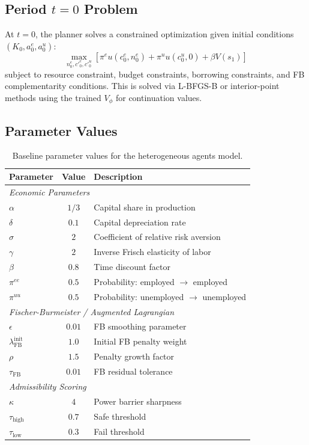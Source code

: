 \subsection{Period $t=0$ Problem}

At $t=0$, the planner solves a constrained optimization given initial conditions $(K_0, a_0^e, a_0^u)$:
\begin{equation}
    \max_{n_0^e, c'^e_0, c'^u_0} \left[ \pi^e u(c_0^e, n_0^e) + \pi^u u(c_0^u, 0) + \beta V(s_1) \right]
\end{equation}
subject to resource constraint, budget constraints, borrowing constraints, and FB complementarity conditions. This is solved via L-BFGS-B or interior-point methods using the trained $V_\phi$ for continuation values.


\subsection{Parameter Values}

\begin{table}[h]
\centering
\begin{tabular}{lcl}
\toprule
\textbf{Parameter} & \textbf{Value} & \textbf{Description} \\
\midrule
\multicolumn{3}{l}{\textit{Economic Parameters}} \\
$\alpha$ & $1/3$ & Capital share in production \\
$\delta$ & $0.1$ & Capital depreciation rate \\
$\sigma$ & $2$ & Coefficient of relative risk aversion \\
$\gamma$ & $2$ & Inverse Frisch elasticity of labor \\
$\beta$ & $0.8$ & Time discount factor \\
$\pi^{ee}$ & $0.5$ & Probability: employed $\to$ employed \\
$\pi^{uu}$ & $0.5$ & Probability: unemployed $\to$ unemployed \\
\midrule
\multicolumn{3}{l}{\textit{Fischer-Burmeister / Augmented Lagrangian}} \\
$\epsilon$ & $0.01$ & FB smoothing parameter \\
$\lambda_{\text{FB}}^{\text{init}}$ & $1.0$ & Initial FB penalty weight \\
$\rho$ & $1.5$ & Penalty growth factor \\
$\tau_{\text{FB}}$ & $0.01$ & FB residual tolerance \\
\midrule
\multicolumn{3}{l}{\textit{Admissibility Scoring}} \\
$\kappa$ & $4$ & Power barrier sharpness \\
$\tau_{\text{high}}$ & $0.7$ & Safe threshold \\
$\tau_{\text{low}}$ & $0.3$ & Fail threshold \\
\bottomrule
\end{tabular}
\caption{Baseline parameter values for the heterogeneous agents model.}
\label{tab:params_ha}
\end{table}


